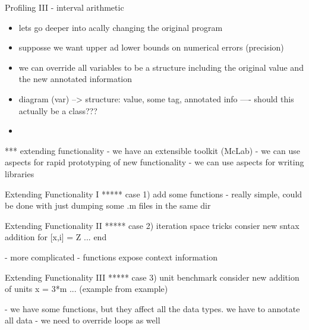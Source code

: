 \begin{frame}{Profiling III - interval arithmetic}
  \begin{itemize}
  \item lets go deeper into acally changing the original program
  \item supposse we want upper ad lower bounds on numerical errors
  (precision)
  \item we can override all variables to be a structure including the
  original value and the new annotated information
  \item diagram (var) --> structure: value, some tag, annotated info
  ---- should this actually be a class???
  \item 
  \end{itemize}
\end{frame}



*** extending functionality
    - we have an extensible toolkit (McLab)
    - we can use aspects for rapid prototyping of new functionality
    - we can use aspects for writing libraries

\begin{frame}{Extending Functionality I}
***** case 1)
      add some functions
      - really simple, could be done with just dumping some .m files in the
        same dir
\end{frame}
\begin{frame}{Extending Functionality II}
***** case 2)
      iteration space tricks
      consier new sntax addition
      for [x,i] = Z
      ...
      end

      - more complicated - functions expose context information

\end{frame}
\begin{frame}{Extending Functionality III}
***** case 3)
      unit benchmark
      consider new addition of units
      x = 3*m
      ... (example from example)

      - we have some functions, but they affect all the data types. we have
        to annotate all data
      - we need to override loops as well

\end{frame}

